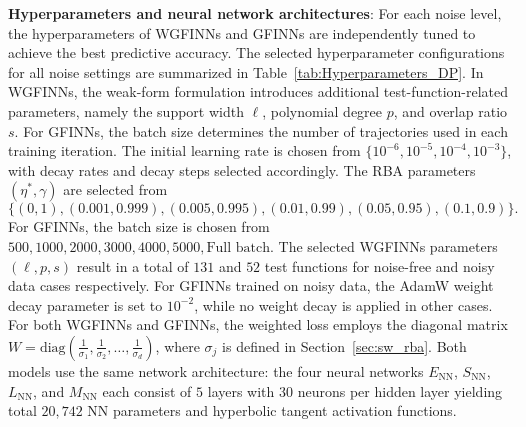 \documentclass[final]{siamltex}
\begin{document}
\begin{appendices}
{\bf Hyperparameters and neural network architectures}:
For each noise level, the hyperparameters of WGFINNs and GFINNs are independently tuned to achieve the best predictive accuracy.
The selected hyperparameter configurations for all noise settings are summarized in Table~\ref{tab:Hyperparameters_DP}.
In WGFINNs, the weak-form formulation introduces additional test-function-related parameters, namely the support width $\ell$, polynomial degree $p$, and overlap ratio $s$.
For GFINNs, the batch size determines the number of trajectories used in each training iteration.
The initial learning rate is chosen from $\{10^{-6}, 10^{-5}, 10^{-4}, 10^{-3}\}$, with decay rates and decay steps selected accordingly.
The RBA parameters $(\eta^*, \gamma)$ are selected from
\begin{equation*}
\{ (0 , 1), (0.001 , 0.999), (0.005 , 0.995), (0.01 , 0.99), (0.05 , 0.95), (0.1, 0.9)\}.
\end{equation*}
For GFINNs, the batch size is chosen from
${500, 1000, 2000, 3000, 4000, 5000, \text{Full batch}}$.
The selected WGFINNs parameters $(\ell, p, s)$ result in a total of $131$ and $52$ test functions for noise-free and noisy data cases respectively.
For GFINNs trained on noisy data, the AdamW weight decay parameter is set to $10^{-2}$, while no weight decay is applied in other cases.
For both WGFINNs and GFINNs, the weighted loss employs the diagonal matrix
$W = \mathrm{diag}\left(\frac{1}{\sigma_1}, \frac{1}{\sigma_2}, \ldots, \frac{1}{\sigma_d}\right)$,
where $\sigma_j$ is defined in Section~\ref{sec:sw_rba}.
Both models use the same network architecture: the four neural networks $E_{\mathrm{NN}}$, $S_{\mathrm{NN}}$, $L_{\mathrm{NN}}$, and $M_{\mathrm{NN}}$ each consist of $5$ layers with $30$ neurons per hidden layer yielding total \(20{,}742\) NN parameters and hyperbolic tangent activation functions.


\end{appendices}
\end{document}
